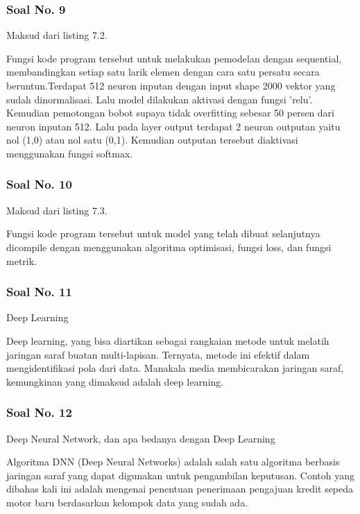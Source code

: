 \subsubsection{Soal No. 9}
Maksud dari listing 7.2.

\hfill \break

Fungsi kode program tersebut untuk melakukan pemodelan dengan sequential, membandingkan setiap satu larik elemen dengan cara satu persatu secara beruntun.Terdapat 512 neuron inputan dengan input shape 2000 vektor yang sudah dinormalisasi. Lalu model dilakukan aktivasi dengan fungsi 'relu'. Kemudian pemotongan bobot supaya tidak overfitting sebesar 50 persen dari neuron inputan 512. Lalu pada layer output terdapat 2 neuron outputan yaitu nol (1,0) atau nol satu (0,1). Kemudian outputan tersebut diaktivasi menggunakan fungsi softmax.

\subsubsection{Soal No. 10}
Maksud dari listing 7.3.

\hfill \break

Fungsi kode program tersebut untuk model yang telah dibuat selanjutnya dicompile dengan menggunakan algoritma optimisasi, fungsi loss, dan fungsi metrik.

\subsubsection{Soal No. 11}
Deep Learning

\hfill \break

Deep learning, yang bisa diartikan sebagai rangkaian metode untuk melatih jaringan saraf buatan multi-lapisan. Ternyata, metode ini efektif dalam mengidentifikasi pola dari data. Manakala media membicarakan jaringan saraf, kemungkinan yang dimaksud adalah deep learning.

\subsubsection{Soal No. 12}
Deep Neural Network, dan apa bedanya dengan Deep Learning

\hfill \break

Algoritma DNN (Deep Neural Networks) adalah salah satu algoritma berbasis jaringan saraf yang dapat digunakan untuk pengambilan keputusan. Contoh yang dibahas kali ini adalah mengenai penentuan penerimaan pengajuan kredit sepeda motor baru berdasarkan kelompok data yang sudah ada. 

